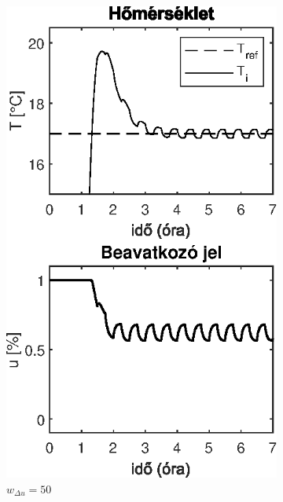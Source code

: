 \begin{figure}[H]
~
\begin{subfigure}[t]{0.32\textwidth}
	\centering
	\includegraphics[width=\textwidth]{figures/realsys/mpc-wdu-50}
	\caption{$w_{\Delta u}=50$}
	\label{fig:mpc-wdu-50}
\end{subfigure}
~
\begin{subfigure}[t]{0.32\textwidth}
	\centering

\end{subfigure}
\end{figure}
